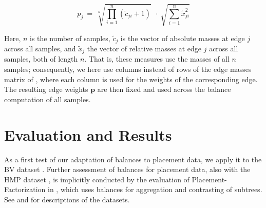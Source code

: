 \begin{equation}
    \label{ch:Balances:sec:Methods:eq:EdgeWeights}
    p_j ~=~ \sqrt[n]{ \prod_{i=1}^{n} ( \tilde{c}_{ji} + 1 ) }  ~~\cdot~  \sqrt{ \sum_{i=1}^{n} \tilde{x}_{ji}^2 }
\end{equation}

Here, $n$ is the number of samples, $\tilde{c}_j$ is the vector of absolute masses at edge $j$ across all samples,
and $\tilde{x}_j$ the vector of relative masses at edge $j$ across all samples, both of length $n$.
That is, these measures use the masses of all $n$ samples;
consequently, we here use columns instead of rows of the edge masses matrix of ,
where each column is used for the weights of the corresponding edge.
The resulting edge weights $\bm{p}$ are then fixed and used across the balance computation of all samples.



\section{Evaluation and Results}
\label{ch:Balances:sec:Results}

As a first test of our adaptation of balances to placement data, we apply it to the \ac{BV} dataset \cite{Srinivasan2012}.
Further assessment of balances for placement data, also with the \ac{HMP} dataset \cite{Huttenhower2012,Methe2012},
is implicitly conducted by the evaluation of Placement-Factorization in ,
which uses balances for aggregation and contrasting of subtrees.
See  and 
for descriptions of the datasets.


